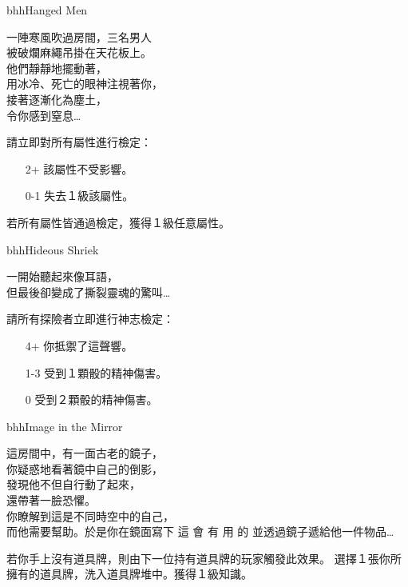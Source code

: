\linebreak[0]%
\begin{EventCard}{bhh}{Hanged Men}
	\begin{CardStory}
		一陣寒風吹過房間，三名男人\\
		被破爛麻繩吊掛在天花板上。\\
		他們靜靜地擺動著，\\
		用冰冷、死亡的眼神注視著你，\\
		接著逐漸化為塵土，\\
		令你感到窒息…
	\end{CardStory}
	請立即對所有屬性進行檢定：
	\begin{itemize}
		\item[2+] 該屬性不受影響。
		\item[0-1] 失去１級該屬性。
	\end{itemize}
	若所有屬性皆通過檢定，獲得１級任意屬性。\smallbreak
\end{EventCard}%
\linebreak[0]%
\begin{EventCard}{bhh}{Hideous Shriek}
	\begin{CardStory}
		一開始聽起來像耳語，\\
		但最後卻變成了撕裂靈魂的驚叫…
	\end{CardStory}
	請所有探險者立即進行神志檢定：
	\begin{itemize}
		\item[4+] 你抵禦了這聲響。
		\item[1-3] 受到１顆骰的精神傷害。
		\item[0] 受到２顆骰的精神傷害。
	\end{itemize}
\end{EventCard}%
\linebreak[0]%
\begin{EventCard}{bhh}{Image in the Mirror}
	\begin{CardStory}
		這房間中，有一面古老的鏡子，\\
		你疑惑地看著鏡中自己的倒影，\\
		發現他不但自行動了起來，\\
		還帶著一臉恐懼。\\
		你瞭解到這是不同時空中的自己，\\
		而他需要幫助。於是你在鏡面寫下\smallbreak
		{ \FontScript 這 \enskip 會 \enskip 有 \enskip 用 \enskip 的 }\smallbreak
		並透過鏡子遞給他一件物品…
	\end{CardStory}
	若你手上沒有道具牌，則由下一位持有道具牌的玩家觸發此效果。\smallbreak
	選擇１張你所擁有的道具牌，洗入道具牌堆中。獲得１級知識。\smallbreak
\end{EventCard}%
